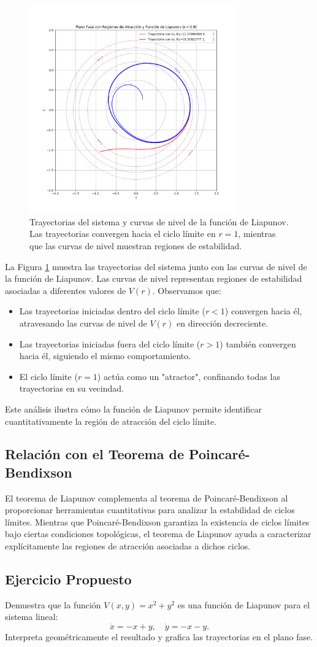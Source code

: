 \begin{figure}[h!]\label{fig:lyapunov_region}
    \centering
    \includegraphics[width=0.8\textwidth]{Img/grafica_lyapunov.png}
    \caption{Trayectorias del sistema y curvas de nivel de la función de Liapunov. Las trayectorias convergen hacia el ciclo límite en $r = 1$, mientras que las curvas de nivel muestran regiones de estabilidad.}
    \label{fig:lyapunov_region}
\end{figure}

La Figura \ref{fig:lyapunov_region} muestra las trayectorias del sistema junto con las curvas de nivel de la función de Liapunov. Las curvas de nivel representan regiones de estabilidad asociadas a diferentes valores de $V(r)$. Observamos que:
\begin{itemize}
    \item Las trayectorias iniciadas dentro del ciclo límite ($r < 1$) convergen hacia él, atravesando las curvas de nivel de $V(r)$ en dirección decreciente.
    \item Las trayectorias iniciadas fuera del ciclo límite ($r > 1$) también convergen hacia él, siguiendo el mismo comportamiento.
    \item El ciclo límite ($r = 1$) actúa como un "atractor", confinando todas las trayectorias en su vecindad.
\end{itemize}

Este análisis ilustra cómo la función de Liapunov permite identificar cuantitativamente la región de atracción del ciclo límite.

\subsection{Relación con el Teorema de Poincaré-Bendixson}
El teorema de Liapunov complementa al teorema de Poincaré-Bendixson al proporcionar herramientas cuantitativas para analizar la estabilidad de ciclos límites. Mientras que Poincaré-Bendixson garantiza la existencia de ciclos límites bajo ciertas condiciones topológicas, el teorema de Liapunov ayuda a caracterizar explícitamente las regiones de atracción asociadas a dichos ciclos.

\subsection*{Ejercicio Propuesto}
Demuestra que la función $V(x, y) = x^2 + y^2$ es una función de Liapunov para el sistema lineal:
\[
\dot{x} = -x + y, \quad \dot{y} = -x - y.
\]
Interpreta geométricamente el resultado y grafica las trayectorias en el plano fase.
